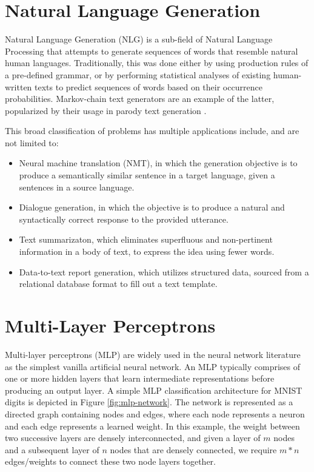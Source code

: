 \section{Natural Language Generation}

Natural Language Generation (NLG) is a sub-field of Natural Language Processing that attempts to generate sequences of words that resemble natural human languages. Traditionally, this was done either by using production rules of a pre-defined grammar, or by performing statistical analyses of existing human-written texts to predict sequences of words based on their occurrence probabilities. Markov-chain text generators are an example of the latter, popularized by their usage in parody text generation \cite{jelinek1985markov}.

This broad classification of problems has multiple applications include, and are not limited to:
\begin{itemize}
	\item Neural machine translation (NMT), in which the generation objective is to produce a semantically similar sentence in a target language, given a sentences in a source language.
	\item Dialogue generation, in which the objective is to produce a natural and syntactically correct response to the provided utterance.
	\item Text summarizaton, which eliminates superfluous and non-pertinent information in a body of text, to express the idea using fewer words.
	\item Data-to-text report generation, which utilizes structured data, sourced from a relational database format to fill out a text template.
\end{itemize}


\section{Multi-Layer Perceptrons}

Multi-layer perceptrons (MLP) are widely used in the neural network literature as the simplest vanilla artificial neural network. An MLP typically comprises of one or more hidden layers that learn intermediate representations before producing an output layer. A simple MLP classification architecture for MNIST digits \citep{lecun2010mnist} \citep{deng2012mnist} is depicted in Figure \ref{fig:mlp-network}. The network is represented as a directed graph containing nodes and edges, where each node represents a neuron and each edge represents a learned weight. In this example, the weight between two successive layers are densely interconnected, and given a layer of $m$ nodes and a subsequent layer of $n$ nodes that are densely connected, we require $m*n$ edges/weights to connect these two node layers together.

